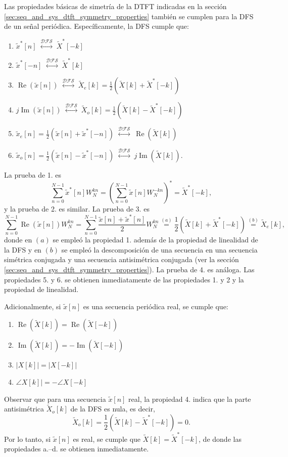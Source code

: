 \documentclass[a4paper]{report}
\renewcommand{\Re}{\operatorname{Re}}
\renewcommand{\Im}{\operatorname{Im}}
\begin{document}
Las propiedades básicas de simetría de la DTFT indicadas en la sección \ref{sec:seq_and_sys_dtft_symmetry_properties} también se cumplen para la DFS de un señal periódica. Específicamente, la DFS cumple que:
\begin{enumerate}
 \item \(\displaystyle{\tilde{x}}^*[n]\;\overset{\mathcal{DFS}}{\longleftrightarrow}\;{\tilde{X}}^*[-k]\)
 \item \(\displaystyle{\tilde{x}}^*[-n]\;\overset{\mathcal{DFS}}{\longleftrightarrow}\;{\tilde{X}}^*[k]\)
 \item \(\displaystyle\Re(\tilde{x}[n])\;\overset{\mathcal{DFS}}{\longleftrightarrow}\;\tilde{X}_e[k]=\frac{1}{2}(\tilde{X}[k]+\tilde{X}^*[-k])\)
 \item \(\displaystyle j\Im(\tilde{x}[n])\;\overset{\mathcal{DFS}}{\longleftrightarrow}\;\tilde{X}_o[k]=\frac{1}{2}(\tilde{X}[k]-\tilde{X}^*[-k])\)
 \item \(\displaystyle \tilde{x}_e[n]=\frac{1}{2}(\tilde{x}[n]+\tilde{x}^*[-n])\;\overset{\mathcal{DFS}}{\longleftrightarrow}\;
 \Re(\tilde{X}[k])\)
 \item \(\displaystyle \tilde{x}_o[n]=\frac{1}{2}(\tilde{x}[n]-\tilde{x}^*[-n])\;\overset{\mathcal{DFS}}{\longleftrightarrow}\;
 j\Im(\tilde{X}[k]).\)
\end{enumerate}
La prueba de 1. es
\[
 \sum_{n=0}^{N-1}{\tilde{x}}^*[n]W_N^{kn}=\left(\sum_{n=0}^{N-1}{\tilde{x}}[n]W_N^{-kn}\right)^*={\tilde{X}}^*[-k],
\]
y la prueba de 2. es similar. La prueba de 3. es
\[
 \sum_{n=0}^{N-1}\Re(\tilde{x}[n])W_N^{kn}=\sum_{n=0}^{N-1}\frac{\tilde{x}[n]+\tilde{x}^*[n]}{2}W_N^{kn}
 \overset{(a)}{=}\frac{1}{2}(\tilde{X}[k]+{\tilde{X}}^*[-k])\overset{(b)}{=}\tilde{X}_e[k],
\]
donde en \((a)\) se empleó la propiedad 1. además de la propiedad de linealidad de la DFS y en \((b)\) se empleó la descomposición de una secuencia en una secuencia simétrica conjugada y una secuencia antisimétrica conjugada (ver la sección \ref{sec:seq_and_sys_dtft_symmetry_properties}). La prueba de 4. es análoga. Las propiedades 5. y 6. se obtienen inmediatamente de las propiedades 1. y 2 y la propiedad de linealidad.

Adicionalmente, si \(\tilde{x}[n]\) es una secuencia periódica real, se cumple que:
\begin{enumerate}[label=\alph*.]
 \item \(\displaystyle\Re(\tilde{X}[k])=\Re(\tilde{X}[-k])\)
 \item \(\displaystyle\Im(\tilde{X}[k])=-\Im(\tilde{X}[-k])\)
 \item \(\displaystyle|X[k]|=|X[-k]|\)
 \item \(\displaystyle\angle X[k]|=-\angle X[-k]\)
\end{enumerate}
Observar que para una secuencia \(\tilde{x}[n]\) real, la propiedad 4. indica que la parte antisimétrica \(\tilde{X}_o[k]\) de la DFS es nula, es decir,
\[
 \tilde{X}_o[k]=\frac{1}{2}(\tilde{X}[k]-\tilde{X}^*[-k])=0.
\]
Por lo tanto, si \(\tilde{x}[n]\) es real, se cumple que \(\tilde{X}[k]=\tilde{X}^*[-k]\), de donde las propiedades a.--d. se obtienen inmediatamente. 
\end{document}
